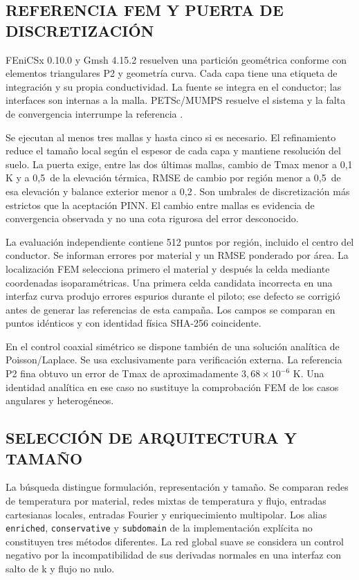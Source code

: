\subsection{REFERENCIA FEM Y PUERTA DE DISCRETIZACIÓN}

FEniCSx 0.10.0 y Gmsh 4.15.2 resuelven una partición geométrica conforme con elementos triangulares P2 y geometría curva. Cada capa tiene una etiqueta de integración y su propia conductividad. La fuente se integra en el conductor; las interfaces son internas a la malla. PETSc/MUMPS resuelve el sistema y la falta de convergencia interrumpe la referencia \parencite{baratta2023dolfinx}.

Se ejecutan al menos tres mallas y hasta cinco si es necesario. El refinamiento reduce el tamaño local según el espesor de cada capa y mantiene resolución del suelo. La puerta exige, entre las dos últimas mallas, cambio de Tmax menor a 0,1 K y a 0,5\,\pct{} de la elevación térmica, RMSE de cambio por región menor a 0,5\,\pct{} de esa elevación y balance exterior menor a 0,2\,\pct{}. Son umbrales de discretización más estrictos que la aceptación PINN. El cambio entre mallas es evidencia de convergencia observada y no una cota rigurosa del error desconocido.

La evaluación independiente contiene 512 puntos por región, incluido el centro del conductor. Se informan errores por material y un RMSE ponderado por área. La localización FEM selecciona primero el material y después la celda mediante coordenadas isoparamétricas. Una primera celda candidata incorrecta en una interfaz curva produjo errores espurios durante el piloto; ese defecto se corrigió antes de generar las referencias de esta campaña. Los campos se comparan en puntos idénticos y con identidad física SHA-256 coincidente.

En el control coaxial simétrico se dispone también de una solución analítica de Poisson/Laplace. Se usa exclusivamente para verificación externa. La referencia P2 fina obtuvo un error de Tmax de aproximadamente $3,68\times10^{-6}$ K. Una identidad analítica en ese caso no sustituye la comprobación FEM de los casos angulares y heterogéneos.

\subsection{SELECCIÓN DE ARQUITECTURA Y TAMAÑO}
\label{sec:seleccion-pinn}

La búsqueda distingue formulación, representación y tamaño. Se comparan redes de temperatura por material, redes mixtas de temperatura y flujo, entradas cartesianas locales, entradas Fourier y enriquecimiento multipolar. Los alias \texttt{enriched}, \texttt{conservative} y \texttt{subdomain} de la implementación explícita no constituyen tres métodos diferentes. La red global suave se considera un control negativo por la incompatibilidad de sus derivadas normales en una interfaz con salto de k y flujo no nulo.

